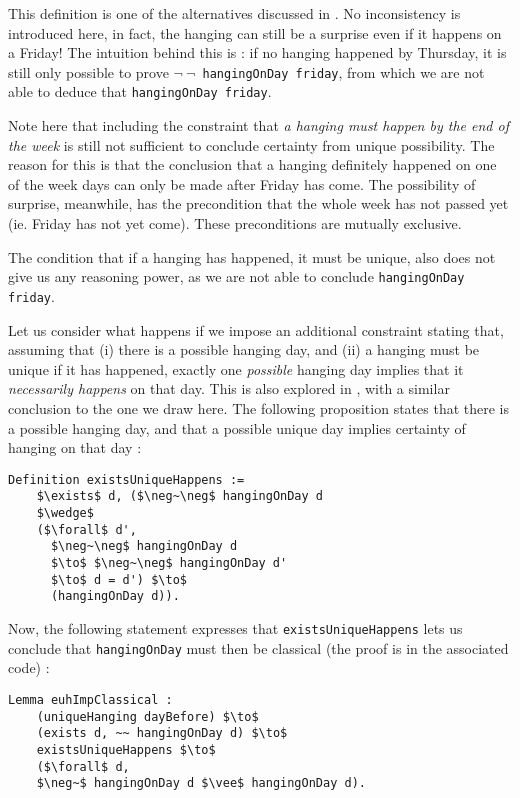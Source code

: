\documentclass[journal]{journal}
\begin{document}
This definition is one of the alternatives discussed in \cite{fourpossible}. No inconsistency
is introduced here, in fact, the hanging can still be a surprise even if it
happens on a Friday! The intuition behind this is : if no hanging happened by
Thursday, it is still only possible to prove {\tt $\neg~\neg$~hangingOnDay friday},
from which we are not able to deduce that {\tt hangingOnDay friday}.

Note here that including the constraint that \emph{a hanging must happen
by the end of the week} is still not sufficient to conclude certainty
from unique possibility. The reason for this is that the conclusion that
a hanging definitely happened on one of the week days can only be made
after Friday has come. The possibility of surprise, meanwhile, has the
precondition that the whole week has not passed yet (ie. Friday has not yet come).
These preconditions are mutually exclusive.

The condition that if a hanging has happened, it must be unique, also does not
give us any reasoning power, as we are not able to conclude {\tt hangingOnDay friday}.

Let us consider what happens if we impose an additional constraint stating that, assuming that
(i) there is a possible hanging day, and (ii) a hanging must be unique if it has
happened, exactly one \emph{possible} hanging
day implies that it \emph{necessarily happens} on that day. This is also explored in
\cite{fourpossible}, with a similar conclusion to the one we draw here. The following
proposition states that there is a possible hanging day, and that a possible
unique day implies certainty of hanging on that day :

\begin{lstlisting}[mathescape=true]
  Definition existsUniqueHappens :=
    $\exists$ d, ($\neg~\neg$ hangingOnDay d
    $\wedge$
    ($\forall$ d',
      $\neg~\neg$ hangingOnDay d
      $\to$ $\neg~\neg$ hangingOnDay d'
      $\to$ d = d') $\to$
      (hangingOnDay d)).
\end{lstlisting}

Now, the following statement expresses that {\tt existsUniqueHappens} lets us
conclude that {\tt hangingOnDay} must then be classical (the proof is in the
associated code) :

\begin{lstlisting}[mathescape=true]
  Lemma euhImpClassical :
    (uniqueHanging dayBefore) $\to$
    (exists d, ~~ hangingOnDay d) $\to$
    existsUniqueHappens $\to$
    ($\forall$ d,
    $\neg~$ hangingOnDay d $\vee$ hangingOnDay d).
\end{lstlisting}
\end{document}
